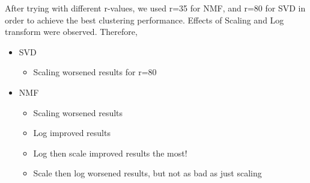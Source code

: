 \documentclass{article}
\begin{document}
After trying with different r-values, we used r=35 for NMF, and r=80 for SVD in order to achieve the best clustering performance. Effects of Scaling and Log transform were observed. Therefore,

\begin{itemize}
	\item SVD
	\begin{itemize}
		\item Scaling worsened results for r=80
	\end{itemize}
    \item NMF
	\begin{itemize}	    
    	\item Scaling worsened results 
		\item Log improved results 
		\item Log then scale improved results the most!
		\item Scale then log worsened results, but not as bad as just scaling	
 	\end{itemize}   
\end{itemize}
\end{document}

